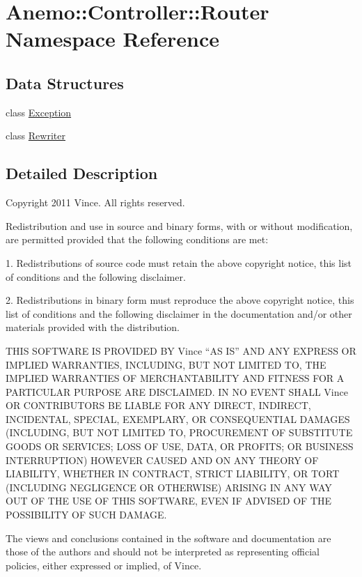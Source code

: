 \hypertarget{namespace_anemo_1_1_controller_1_1_router}{
\section{Anemo::Controller::Router Namespace Reference}
\label{namespace_anemo_1_1_controller_1_1_router}
}
\subsection*{Data Structures}
\begin{DoxyCompactItemize}
\item 
class \hyperlink{class_anemo_1_1_controller_1_1_router_1_1_exception}{Exception}
\item 
class \hyperlink{class_anemo_1_1_controller_1_1_router_1_1_rewriter}{Rewriter}
\end{DoxyCompactItemize}


\subsection{Detailed Description}
Copyright 2011 Vince. All rights reserved.

Redistribution and use in source and binary forms, with or without modification, are permitted provided that the following conditions are met:

1. Redistributions of source code must retain the above copyright notice, this list of conditions and the following disclaimer.

2. Redistributions in binary form must reproduce the above copyright notice, this list of conditions and the following disclaimer in the documentation and/or other materials provided with the distribution.

THIS SOFTWARE IS PROVIDED BY Vince ``AS IS'' AND ANY EXPRESS OR IMPLIED WARRANTIES, INCLUDING, BUT NOT LIMITED TO, THE IMPLIED WARRANTIES OF MERCHANTABILITY AND FITNESS FOR A PARTICULAR PURPOSE ARE DISCLAIMED. IN NO EVENT SHALL Vince OR CONTRIBUTORS BE LIABLE FOR ANY DIRECT, INDIRECT, INCIDENTAL, SPECIAL, EXEMPLARY, OR CONSEQUENTIAL DAMAGES (INCLUDING, BUT NOT LIMITED TO, PROCUREMENT OF SUBSTITUTE GOODS OR SERVICES; LOSS OF USE, DATA, OR PROFITS; OR BUSINESS INTERRUPTION) HOWEVER CAUSED AND ON ANY THEORY OF LIABILITY, WHETHER IN CONTRACT, STRICT LIABILITY, OR TORT (INCLUDING NEGLIGENCE OR OTHERWISE) ARISING IN ANY WAY OUT OF THE USE OF THIS SOFTWARE, EVEN IF ADVISED OF THE POSSIBILITY OF SUCH DAMAGE.

The views and conclusions contained in the software and documentation are those of the authors and should not be interpreted as representing official policies, either expressed or implied, of Vince. 